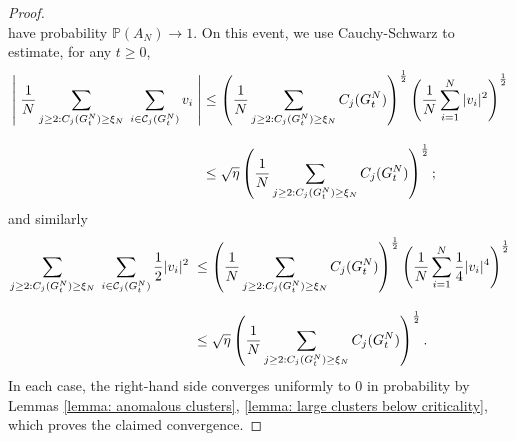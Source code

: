 \begin{proof}
\begin{equation}
    \end{equation} have probability $\mathbb{P}(A_N)\rightarrow 1$. On this event, we use Cauchy-Schwarz to estimate, for any $t\ge 0$, \begin{equation}\begin{split} \label{eq: use of CS 1}\left|\hspace{0.1cm}\frac{1}{N}\sum_{j\geq 2: C_j(G^N_t)\geq \xi_N} \hspace{0.1cm}\sum_{i \in \mathcal{C}_j(G^N_t)} v_i \hspace{0.1cm}\right| & \leq \left(\frac{1}{N}\sum_{j\geq 2: C_j(G^N_t)\geq \xi_N} C_j(G^N_t)\right)^\frac{1}{2}\left(\frac{1}{N}\sum_{i=1}^N |v_i|^2\right)^\frac{1}{2} \\[2ex] & \le  \sqrt{\eta}\left(\frac{1}{N}\sum_{j\geq 2: C_j(G^N_t)\geq \xi_N} C_j(G^N_t)\right)^\frac{1}{2}; \end{split} \end{equation} and similarly \begin{equation} \label{eq: use of CS 2} \begin{split} \sum_{j\geq 2: C_j(G^N_t)\geq \xi_N} \hspace{0.1cm}\sum_{i \in \mathcal{C}_j(G^N_t)} \frac{1}{2}|v_i|^2 \hspace{0.1cm} & \leq \left(\frac{1}{N}\sum_{j\geq 2: C_j(G^N_t)\geq \xi_N} C_j(G^N_t)\right)^\frac{1}{2}\left(\frac{1}{N}\sum_{i=1}^N \frac{1}{4}|v_i|^4\right)^\frac{1}{2} \\[2ex] & \leq \sqrt{\eta}\left(\frac{1}{N}\sum_{j\geq 2: C_j(G^N_t)\geq \xi_N} C_j(G^N_t)\right)^\frac{1}{2}. \end{split}\end{equation} In each case, the right-hand side converges uniformly to $0$ in probability by Lemmas \ref{lemma: anomalous clusters}, \ref{lemma: large clusters below criticality}, which proves the claimed convergence. \end{proof} 

